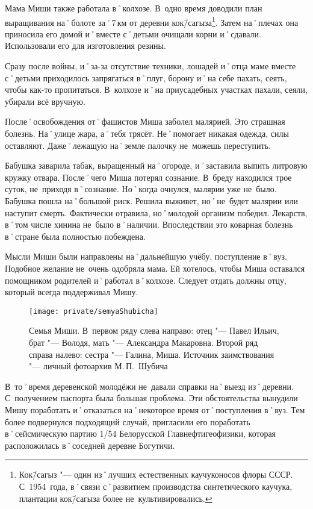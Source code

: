 Мама Миши также работала в˚колхозе. В~одно время доводили план выращивания на˚болоте за˚7\,км от деревни кок\=/сагыза\footnote{Кок\=/сагыз "--- один из˚лучших естественных каучуконосов флоры СССР. С~1954~года, в˚связи с˚развитием производства синтетического каучука, плантации кок\=/сагыза более не~культивировались.}. Затем на˚плечах она приносила его домой и˚вместе с˚детьми очищали корни и˚сдавали. Использовали его для изготовления резины.

Сразу после войны, и˚за-за отсутствие техники, лошадей и˚отца маме вместе с˚детьми приходилось запрягаться в˚плуг, борону и˚на себе пахать, сеять, чтобы как-то пропитаться. В~колхозе и˚на приусадебных участках пахали, сеяли, убирали всё вручную.

После˚освобождения от˚фашистов Миша заболел малярией. Это страшная болезнь. На˚улице жара, а˚тебя трясёт. Не˚помогает никакая одежда, силы оставляют. Даже˚лежащую на˚земле палочку не~можешь переступить. 

Бабушка заварила табак, выращенный на˚огороде, и˚заставила выпить литровую кружку отвара. После˚чего Миша потерял сознание. В~бреду находился трое суток, не~приходя в˚сознание. Но˚когда очнулся, малярии уже не~было. Бабушка пошла на˚большой риск. Решила выживет, но˚не~будет малярии или наступит смерть. Фактически отравила, но˚молодой организм победил. Лекарств, в˚том числе хинина не~было в˚наличии. Впоследствии это коварная болезнь в˚стране была полностью побеждена.

Мысли Миши были направлены на˚дальнейшую учёбу, поступление в˚вуз. Подобное желание не~очень одобряла мама. Ей хотелось, чтобы Миша оставался помощником родителей и˚работал в˚колхозе. Следует отдать должны отцу, который всегда поддерживал Мишу. 

\begin{figure}[h]
\texttt{[image: private/semyaShubicha]}
\caption{Семья Миши. В~первом ряду слева направо: отец "--- Павел Ильич, брат "--- Володя, мать "--- Александра Макаровна. Второй ряд справа налево: сестра "--- Галина, Миша. Источник заимствования "--- личный фотоархив М.\,П.~Шубича}
\label{fig:semyaShubicha}
\end{figure}

В~то˚время деревенской молодёжи не~давали справки на˚выезд из˚деревни. С~получением паспорта была большая проблема. Эти обстоятельства вынудили Мишу поработать и˚отказаться на˚некоторое время от˚поступления в˚вуз. Тем более подвернулся подходящий случай, пригласили его поработать в˚сейсмическую партию 1/54 Белорусской Главнефтигеофизики, которая расположилась в˚соседней деревне Богутичи.

